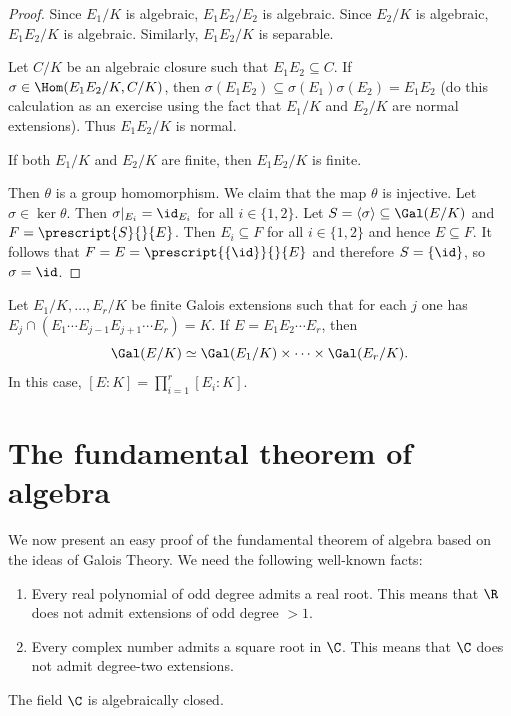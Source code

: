 \begin{proof}
    Since $E_1/K$ is algebraic, 
    $E_1E_2/E_2$ is algebraic. Since $E_2/K$ is algebraic, $E_1E_2/K$ is algebraic. Similarly, 
    $E_1E_2/K$ is separable. 
    
    Let $C/K$ be an algebraic closure such that $E_1E_2\subseteq C$. If $\sigma\in\Hom(E_1E_2/K,C/K)$, then 
    $\sigma(E_1E_2)\subseteq\sigma(E_1)\sigma(E_2)=E_1E_2$ (do this calculation as an exercise using the fact that
    $E_1/K$ and $E_2/K$ are normal extensions). 
    Thus $E_1E_2/K$ is normal. 
    
    If both $E_1/K$ and $E_2/K$ are finite, then $E_1E_2/K$ is finite. 
    
    Then $\theta$ is a group homomorphism. We claim that the map $\theta$ is injective. Let $\sigma\in\ker\theta$. Then
    $\sigma|_{E_i}=\id_{E_i}$ for all $i\in\{1,2\}$. Let $S=\langle\sigma\rangle\subseteq\Gal(E/K)$ and
    $F=\prescript{S}{}{E}$. Then $E_i\subseteq F$ for all $i\in\{1,2\}$ and
    hence $E\subseteq F$. It follows that $F=E=\prescript{\{\id\}}{}{E}$ and therefore $S=\{\id\}$, so 
    $\sigma=\id$. 
\end{proof}

\begin{exercise}
    Let $E_1/K,\dots,E_r/K$ be finite Galois extensions such that for each $j$ 
    one has $E_j\cap (E_1\cdots E_{j-1}E_{j+1}\cdots E_r)=K$. If $E=E_1E_2\cdots E_r$, then
    \[
    \Gal(E/K)\simeq\Gal(E_1/K)\times\cdots\times\Gal(E_r/K).
    \]
    In this case, $[E:K]=\prod_{i=1}^r[E_i:K]$. 
\end{exercise}

\section{The fundamental theorem of algebra}

We now present an easy proof of the fundamental theorem 
of algebra based on the ideas of Galois Theory. 
We need the following well-known facts:
\begin{enumerate}
\item Every real polynomial of odd degree admits a real root. This means that $\R$ 
does not admit extensions of odd degree $>1$. 
\item Every complex number admits a square root in $\C$. This means that $\C$ 
does not admit degree-two extensions.
\end{enumerate}

\begin{theorem}
The field $\C$ is algebraically closed.
\end{theorem}

